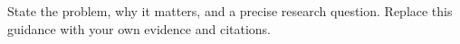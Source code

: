 State the problem, why it matters, and a precise research question. Replace this guidance with your own evidence and citations.
